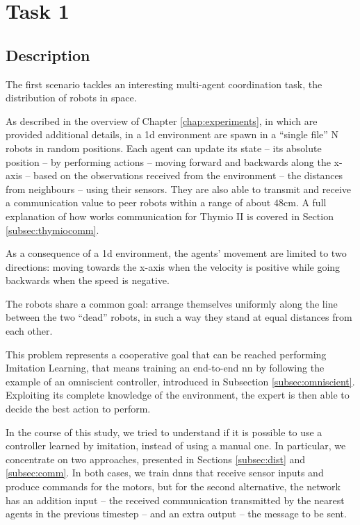 \section{Task 1}
\label{sec:task1}

\subsection{Description}
\label{subsec:desc1}

The first scenario tackles an interesting multi-agent coordination task, the 
distribution of robots in space.

As described in the overview of Chapter \ref{chap:experiments}, in which are 
provided additional details, in a \gls{1d} environment are spawn in a ``single 
file'' N robots in random positions. %
Each agent can update its state – its absolute position – by performing actions – 
moving forward and backwards along the x-axis – based on the observations 
received from the environment – the distances from neighbours – using their 
sensors.  They are also able to transmit and receive a communication value to 
peer robots within a range of about $48$\gls{cm}. 
A full explanation of how works communication for Thymio II is covered in 
Section \ref{subsec:thymiocomm}.

As a consequence of a \gls{1d} environment, the agents' movement are 
limited to two directions: moving towards the x-axis when the velocity is positive 
while going backwards when the speed is negative. 

The robots share a common goal: arrange themselves uniformly along the 
line between the two ``dead'' robots, in such a way they stand at equal distances 
from each other.


This problem represents a cooperative goal that can be reached performing 
Imitation Learning, that means training an end-to-end \gls{nn} by following 
the example of an omniscient controller, introduced in Subsection 
\ref{subsec:omniscient}.
Exploiting its complete knowledge of the environment, %
the expert is then able to decide the best action to perform.

In the course of this study, we tried to understand if it is possible to use a 
controller learned by imitation, instead of using a manual one. In particular, we 
concentrate on two approaches, presented in Sections \ref{subsec:dist} and 
\ref{subsec:comm}.
In both cases, we train \glspl{dnn} that receive sensor inputs and produce 
commands for the motors, but for the second alternative, the network has an 
addition input – the received communication transmitted by the nearest agents in 
the previous timestep – and an extra output – the message to be sent.


